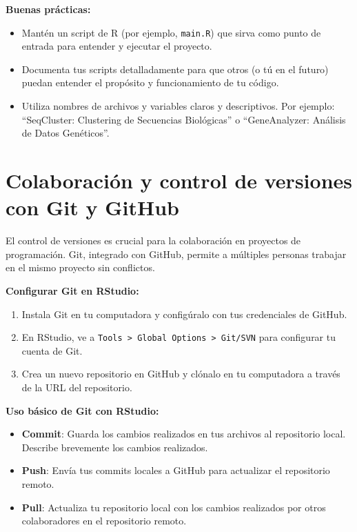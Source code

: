 \documentclass[
]{book}
\providecommand{\tightlist}{%
  \setlength{\itemsep}{0pt}\setlength{\parskip}{0pt}}
\begin{document}
\textbf{Buenas prácticas:}

\begin{itemize}
\tightlist
\item
  Mantén un script de R (por ejemplo, \texttt{main.R}) que sirva como punto de entrada para entender y ejecutar el proyecto.
\item
  Documenta tus scripts detalladamente para que otros (o tú en el futuro) puedan entender el propósito y funcionamiento de tu código.
\item
  Utiliza nombres de archivos y variables claros y descriptivos. Por ejemplo: ``SeqCluster: Clustering de Secuencias Biológicas'' o ``GeneAnalyzer: Análisis de Datos Genéticos''.
\end{itemize}

\section{Colaboración y control de versiones con Git y GitHub}\label{colaboraciuxf3n-y-control-de-versiones-con-git-y-github}

El control de versiones es crucial para la colaboración en proyectos de programación. Git, integrado con GitHub, permite a múltiples personas trabajar en el mismo proyecto sin conflictos.

\textbf{Configurar Git en RStudio:}

\begin{enumerate}
\def\labelenumi{\arabic{enumi}.}
\tightlist
\item
  Instala Git en tu computadora y configúralo con tus credenciales de GitHub.
\item
  En RStudio, ve a \texttt{Tools\ \textgreater{}\ Global\ Options\ \textgreater{}\ Git/SVN} para configurar tu cuenta de Git.
\item
  Crea un nuevo repositorio en GitHub y clónalo en tu computadora a través de la URL del repositorio.
\end{enumerate}

\textbf{Uso básico de Git con RStudio:}

\begin{itemize}
\tightlist
\item
  \textbf{Commit}: Guarda los cambios realizados en tus archivos al repositorio local. Describe brevemente los cambios realizados.
\item
  \textbf{Push}: Envía tus commits locales a GitHub para actualizar el repositorio remoto.
\item
  \textbf{Pull}: Actualiza tu repositorio local con los cambios realizados por otros colaboradores en el repositorio remoto.
\end{itemize}
\end{document}
